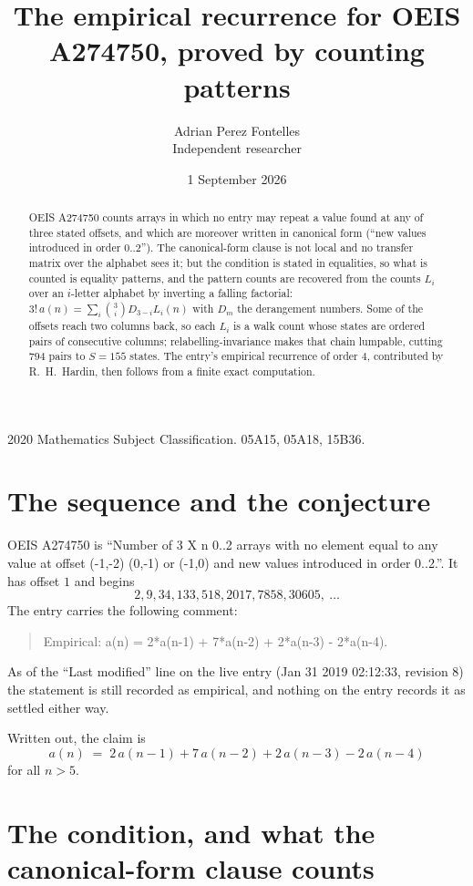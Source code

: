 \documentclass[11pt,a4paper]{article}
\title{The empirical recurrence for OEIS A274750, proved by counting patterns}
\author{Adrian Perez Fontelles\\ \small Independent researcher}
\date{1 September 2026}
\theoremstyle{plain}
\theoremstyle{definition}
\begin{document}
\maketitle

\begin{abstract}
OEIS A274750 counts arrays in which no entry may repeat a value found at any of three stated
offsets, and which are moreover written in canonical form (``new values introduced in order
$0..2$''). The canonical-form clause is not local and no transfer matrix over the
alphabet sees it; but the condition is stated in equalities, so what is counted is equality
patterns, and the pattern counts are recovered from the counts $L_i$ over an $i$-letter
alphabet by inverting a falling factorial:
$3!\,a(n)=\sum_i\binom{3}{i}D_{3-i}L_i(n)$ with $D_m$ the derangement numbers.
Some of the offsets reach two columns back, so each $L_i$ is a walk count whose states are
ordered pairs of consecutive columns; relabelling-invariance makes that chain lumpable,
cutting $794$ pairs to $S=155$ states. The entry's empirical recurrence of order $4$,
contributed by R.~H.~Hardin, then follows from a finite exact computation.
\end{abstract}

\noindent\small 2020 Mathematics Subject Classification. 05A15, 05A18, 15B36.\normalsize

\section{The sequence and the conjecture}

OEIS A274750 is ``Number of 3 X n 0..2 arrays with no element equal to any value at offset (-1,-2) (0,-1) or (-1,0) and new values introduced in order 0..2.''. It has offset $1$ and begins
\[
2, 9, 34, 133, 518, 2017, 7858, 30605,\ \dots
\]
The entry carries the following comment:
\begin{quote}\small
Empirical: a(n) = 2*a(n-1) + 7*a(n-2) + 2*a(n-3) - 2*a(n-4).
\end{quote}
As of the ``Last modified'' line on the live entry (Jan 31 2019 02:12:33, revision 8) the statement is
still recorded as empirical, and nothing on the entry records it as settled either way.

Written out, the claim is
\begin{equation}\label{eq:conj}
a(n)\;=\;2\,a(n-1) + 7\,a(n-2) + 2\,a(n-3) - 2\,a(n-4)
\end{equation}
for all $n>5$.

\section{The condition, and what the canonical-form clause counts}
\end{document}
